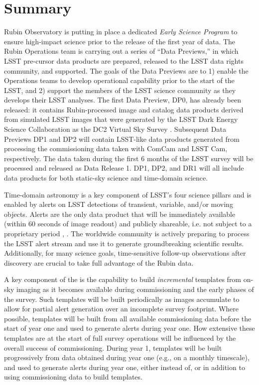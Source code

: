 \section{Summary}

Rubin Observatory is putting in place a dedicated {\it Early Science Program} to ensure high-impact science prior to the release of the first year of \lsst data.
The Rubin Operations team is carrying out a series of ``Data Previews,'' in which LSST pre-cursor data products are prepared, released to the LSST data rights community, and supported.
The goals of the Data Previews are to 1) enable the Operations teams to develop operational capability prior to the start of the LSST, and 2) support the members of the LSST science community as they develops their LSST analyses.
The first Data Preview, DP0, has already been released: it contains Rubin-processed image and catalog data products derived from simulated LSST images that were generated by the LSST Dark Energy Science Collaboration as the DC2 Virtual Sky Survey \citep{2021ApJS..253...31L}.
Subsequent Data Previews DP1 and DP2 will contain LSST-like data products generated from processing the commissioning data taken with ComCam and LSST Cam, respectively.
The data taken during the first 6 months of the LSST survey will be processed and released as Data Release 1.
DP1, DP2, and DR1 will all include data products for both static-sky science and time-domain science.

Time-domain astronomy is a key component of LSST's four science pillars and is enabled by alerts on LSST detections of transient, variable, and/or moving objects.
Alerts are the only data product that will be immediately available (within 60 seconds of image readout) and publicly shareable, i.e. not subject to a proprietary period \citep{LSE-163},  \citep{RDO-013}.
The worldwide community is actively preparing to process the LSST alert stream and use it to generate groundbreaking scientific results. Additionally, for many science goals, time-sensitive follow-up observations after discovery are crucial to take full advantage of the Rubin data.

A key component of the \esp is the capability to build {\it incremental} templates from on-sky imaging as it becomes available during commissioning and the early phases of the survey.
Such templates will be built periodically as images accumulate to allow for partial alert generation over an incomplete survey footprint.
Where possible, templates will be built from all available commissioning data before the start of year one and used to generate alerts during year one.
How extensive these templates are at the start of full survey operations will be influenced by the overall success of commissioning.
During year 1, templates will be built progressively from data obtained during year one (e.g., on a monthly timescale), and used to generate alerts during year one, either instead of, or in addition to using commissioning data to build templates.
